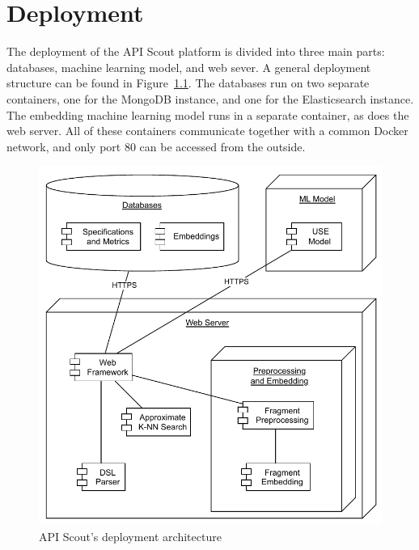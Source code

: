 \chapter{Deployment}\label{ch:deployment}
The deployment of the API Scout platform is divided into three main parts: databases, machine learning model, and web sever.
A general deployment structure can be found in Figure~\ref{fig:deployment-architecture}.
The databases run on two separate containers, one for the MongoDB instance, and one for the Elasticsearch instance.
The embedding machine learning model runs in a separate container, as does the web server.
All of these containers communicate together with a common Docker network, and only port 80 can be accessed from the outside.

\begin{figure}[h]
    \begin{center}
        \includegraphics[width=0.55\linewidth]{assets/pdf/architecture/deployment-view}
    \end{center}

    \caption{API Scout's deployment architecture}
    \label{fig:deployment-architecture}
\end{figure}





